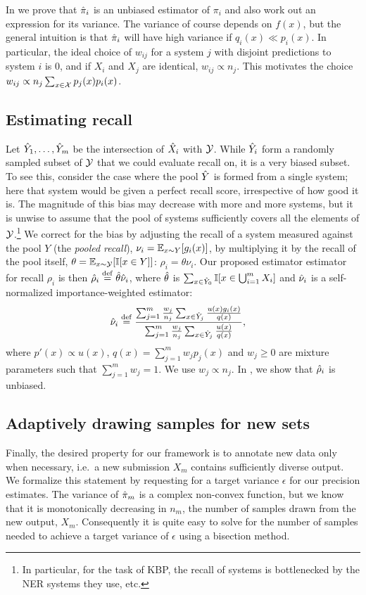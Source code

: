 In  we prove that ${\hat{\pi}}_i$ is an unbiased estimator of $\pi_i$ and also work out an expression for its variance. 
The variance of course depends on $f(x)$, but the general intuition is that 
${\hat{\pi}}_i$ will have high variance if $q_i(x) \ll p_i(x)$.
In particular, the ideal choice of $w_{ij}$ for a system $j$ with disjoint predictions to system $i$ is $0$, and if $X_i$ and $X_j$ are identical, $w_{ij} \propto n_{j}$.
This motivates the choice $w_{ij} \propto n_{j} \sum_{x \in \mathcal{X}} p_j(x) p_i(x)$.

\subsection{Estimating recall}
Let ${\hat{Y}}_1, \ldots, {\hat{Y}}_m$ be the intersection of ${\hat{X}}_i$ with $\mathcal{Y}$.
While ${\hat{Y}}_i$ form a randomly sampled subset of $\mathcal{Y}$ that we could evaluate recall on, it is a very biased subset.
To see this, consider the case where the pool ${\hat{Y}}$ is formed from a single system; here that system would be given a perfect recall score, irrespective of how good it is.
The magnitude of this bias may decrease with more and more systems, but it is unwise to assume that the pool of systems sufficiently covers all the elements of $\mathcal{Y}$.\footnote{
  In particular, for the task of KBP, the recall of systems is bottlenecked by the NER systems they use, etc.
}
We correct for the bias by adjusting the recall of a system measured against the pool $Y$ (the \textit{pooled recall}), $\nu_i = \mathbb{E}_{x\sim Y}[g_i(x)]$, by multiplying it by the recall of the pool itself, $\theta = \mathbb{E}_{x\sim\mathcal{Y}}[\mathbb{I}[x \in Y]]$: $\rho_i = \theta \nu_i$.
Our proposed estimator estimator for recall $\rho_i$ is then ${\hat{\rho}}_i \stackrel{\rm def}{=} {\hat{\theta}}{\hat{\nu}}_i$, where ${\hat{\theta}}$ is $\sum_{x \in {\hat{Y}}_0} \mathbb{I}[x \in \bigcup_{i=1}^m X_i]$ and ${\hat{\nu}}_i$ is a self-normalized importance-weighted estimator:
\begin{align*}
  {\hat{\nu}}_i &\stackrel{\rm def}{=} \frac{\sum_{j=1}^m \frac{w_j}{n_j} \sum_{x \in {\hat{Y}}_j} \frac{u(x) g_i(x)}{q(x)}}{\sum_{j=1}^m \frac{w_j}{n_j} \sum_{x \in {\hat{Y}}_j} \frac{u(x)}{q(x)}},
\end{align*}
where $p'(x) \propto u(x)$, $q(x) = \sum_{j=1}^m w_{j} p_j(x)$ and $w_{j} \ge 0$ are mixture parameters such that $\sum_{j=1}^m w_{j} = 1$. We use $w_j \propto n_j$.
In , we show that ${\hat{\rho}}_i$ is unbiased.

\subsection{Adaptively drawing samples for new sets}
Finally, the desired property for our framework is to annotate new data only when necessary, i.e.\ a new submission $X_m$ contains sufficiently diverse output.
We formalize this statement by requesting for a target variance $\epsilon$ for our precision estimates.
The variance of ${\hat{\pi}}_m$ is a complex non-convex function, but we know that it is monotonically decreasing in $n_m$, the number of samples drawn from the new output, $X_m$.
Consequently it is quite easy to solve for the number of samples needed to achieve a target variance of $\epsilon$ using a bisection method.
